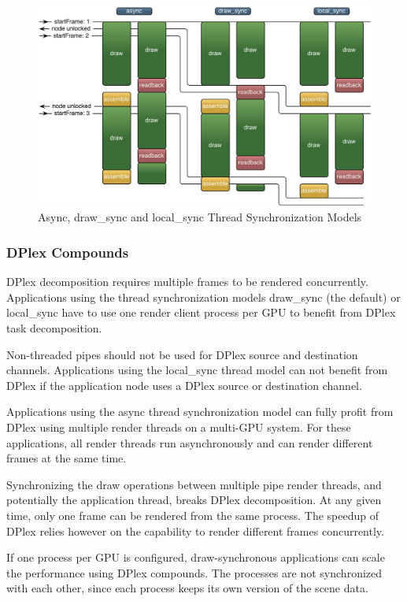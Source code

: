 \documentclass[10pt,a4]{scrartcl}
\begin{document}
\begin{figure}[h!t]\center
  \includegraphics[width=.9\textwidth]{images/threadModels.pdf}
  {\caption{\label{fThreadModels}Async, draw\_sync and local\_sync
    Thread Synchronization Models}}
\end{figure}


\subsubsection{\label{sAdvDPlex}DPlex Compounds}

DPlex decomposition requires multiple frames to be rendered
concurrently. Applications using the thread synchronization models
\textsf{draw\_sync} (the default) or \textsf{local\_sync} have to use
one render client process per GPU to benefit from DPlex task
decomposition.

Non-threaded pipes should not be used for DPlex source and destination
channels. Applications using the \textsf{local\_sync} thread model can
not benefit from DPlex if the application node uses a DPlex source or
destination channel.

Applications using the \textsf{async} thread synchronization model can
fully profit from DPlex using multiple render threads on a multi-GPU
system. For these applications, all render threads run asynchronously
and can render different frames at the same time.

Synchronizing the draw operations between multiple pipe render threads,
and potentially the application thread, breaks DPlex decomposition. At
any given time, only one frame can be rendered from the same
process. The speedup of DPlex relies however on the capability to
render different frames concurrently.

If one process per GPU is configured, draw-synchronous applications can
scale the performance using DPlex compounds. The processes are not
synchronized with each other, since each process keeps its own version
of the scene data.
\end{document}
